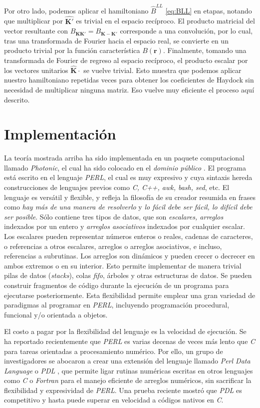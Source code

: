 \documentclass[12pt]{article}
\begin{document}
Por otro lado, podemos  aplicar el hamiltoniano $\hat
B^{LL}$ \eqref{eq:BLL} en
etapas, notando que multiplicar por $\hat{\bm K'}$ es trivial en el
espacio recíproco. El producto matricial del vector resultante con
$B_{\bm K\bm K'}=B_{\bm K-\bm K'}$ corresponde a una convolución, por lo
cual, tras una transformada de Fourier hacia el espacio real, se
convierte  en un producto trivial por la función
característica $B(\bm r)$. Finalmente, tomando una transformada de
Fourier de regreso al espacio recíproco, el producto escalar por los vectores
unitarios $\hat{\bm K}\cdot$ se vuelve trivial. Esto muestra que podemos
aplicar nuestro hamiltoniano repetidas veces para obtener los
coeficientes de Haydock sin necesidad de multiplicar ninguna
matriz. Eso vuelve muy eficiente el proceso aquí descrito.

\section{Implementación}
La teoría mostrada arriba ha sido implementada en un paquete
computacional llamado {\em Photonic}, el cual ha sido colocado en el
{\em dominio público} \cite{PhotonicCPAN,PhotonicGitHub}. El programa está
escrito en el lenguaje {\em PERL}, el cual es muy expresivo y cuya
sintaxis hereda construcciones de lenguajes previos como {\em C, C++,
  awk, bash, sed}, etc. El lenguaje es versátil y flexible, y refleja
la filosofía de su creador resumida en frases como {\em hay más de una
  manera de resolverlo} y {\em lo fácil debe ser fácil, lo difícil
  debe ser posible}. Sólo contiene tres tipos de datos, que son {\em
  escalares, arreglos} indexados por un entero y {\em arreglos
  asociativos} indexados por cualquier escalar. Los escalares pueden
representar números enteros o reales, cadenas de caracteres, o
referencias a otros escalares, arreglos o arreglos asociativos, e
incluso, referencias a subrutinas. Los arreglos son dinámicos y pueden
crecer o decrecer en ambos extremos o en su interior. Esto permite
implementar de manera trivial pilas de datos ({\em stacks}), colas {\em
  fifo}, árboles y otras estructuras de datos. Se pueden
construir fragmentos de código durante la ejecución de un programa
para ejecutarse posteriormente. Esta flexibilidad permite
emplear una gran variedad de paradigmas al programar en {\em PERL},
incluyendo programación procedural, funcional y/o orientada a
objetos.

El costo a pagar por la flexibilidad del lenguaje es la velocidad de
ejecución. Se ha reportado recientemente que {\em PERL} es varias decenas de
veces más lento que {\em C} para tareas orientadas a procesamiento
numérico.\cite{benchmark} Por ello, un grupo de investigadores se
abocaron a crear una extensión del lenguaje llamado {\em Perl Data
  Language} o {\em PDL} \cite{PDL, PDLCPAN, PDLGitHUb}, que permite
ligar rutinas numéricas escritas en otros lenguajes como {\em C} o
{\em Fortran} para el manejo eficiente de arreglos numéricos, sin
sacrificar la flexibilidad y expresividad de {\em PERL}. Una prueba
reciente\cite{benchmark} mostró que {\em PDL} es competitivo y hasta
puede superar en velocidad a códigos nativos en {\em C}.
\end{document}
